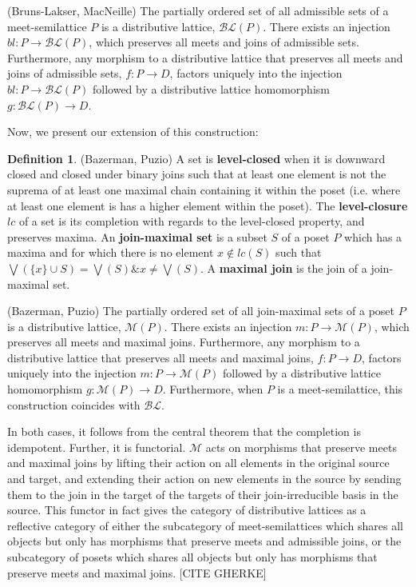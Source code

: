\documentclass[hoptionsi,review,format=acmsmall]{acmart}
\theoremstyle{definition}
\newtheorem{definition}{Definition}[section]
\newcommand{\Mcc}{\mathcal{M}}
\newcommand{\BLc}{\mathcal{BL}}
\newcommand{\band}{\mathbin{\&}}
\begin{document}
\begin{theorem}
(Bruns-Lakser, MacNeille) The partially ordered set of all admissible sets of a meet-semilattice \(P\) is a distributive lattice, \(\BLc(P)\). There exists an injection \(bl : P \rightarrow \BLc(P)\), which preserves all meets and joins of admissible sets. Furthermore, any morphism to a distributive lattice that preserves all meets and joins of admissible sets, \(f : P \rightarrow D\), factors uniquely into the injection \(bl : P \rightarrow \BLc(P)\) followed by a distributive lattice homomorphism \(g : \BLc(P) \rightarrow D\).
\end{theorem}

Now, we present our extension of this construction:

\begin{definition}
(Bazerman, Puzio) A set is \textbf{level-closed} when it is downward closed and closed under binary joins such that at least one element is not the suprema of at least one maximal chain containing it within the poset (i.e. where at least one element is has a higher element within the poset). The \textbf{level-closure} \(lc\) of a set is its completion with regards to the level-closed property, and preserves maxima. An \textbf{join-maximal set} is a subset \(S\) of a poset \(P\) which has a maxima and for which there is no element \(x \notin lc(S)\) such that \(\bigvee(\{x\} \cup S) = \bigvee(S) \band x \neq \bigvee(S)\). A \textbf{maximal join} is the join of a join-maximal set.
\end{definition}

\begin{theorem}
(Bazerman, Puzio) The partially ordered set of all join-maximal sets of a poset \(P\) is a distributive lattice, \(\Mcc(P)\). There exists an injection \(m : P \rightarrow \Mcc(P)\), which preserves all meets and maximal joins. Furthermore, any morphism to a distributive lattice that preserves all meets and maximal joins, \(f : P \rightarrow D\), factors uniquely into the injection \(m : P \rightarrow \Mcc(P)\) followed by a distributive lattice homomorphism \(g : \Mcc(P) \rightarrow D\). Furthermore, when \(P\) is a meet-semilattice, this construction coincides with \(\BLc\).
\end{theorem}

In both cases, it follows from the central theorem that the completion is idempotent. Further, it is functorial. \(\Mcc\) acts on morphisms that preserve meets and maximal joins by lifting their action on all elements in the original source and target, and extending their action on new elements in the source by sending them to the join in the target of the targets of their join-irreducible basis in the source. This functor in fact gives the category of distributive lattices as a reflective category of either the subcategory of meet-semilattices which shares all objects but only has morphisms that preserve meets and admissible joins, or the subcategory of posets which shares all objects but only has morphisms that preserve meets and maximal joins. [CITE GHERKE]
\end{document}
